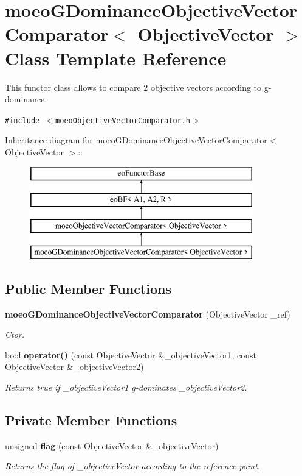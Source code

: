 \section{moeo\-GDominance\-Objective\-Vector\-Comparator$<$ Objective\-Vector $>$ Class Template Reference}
\label{classmoeoGDominanceObjectiveVectorComparator}
This functor class allows to compare 2 objective vectors according to g-dominance.  


{\tt \#include $<$moeo\-Objective\-Vector\-Comparator.h$>$}

Inheritance diagram for moeo\-GDominance\-Objective\-Vector\-Comparator$<$ Objective\-Vector $>$::\begin{figure}[H]
\begin{center}
\leavevmode
\includegraphics[height=4cm]{classmoeoGDominanceObjectiveVectorComparator}
\end{center}
\end{figure}
\subsection*{Public Member Functions}
\begin{CompactItemize}
\item 
{\bf moeo\-GDominance\-Objective\-Vector\-Comparator} (Objective\-Vector \_\-ref)
\begin{CompactList}\small\item\em Ctor. \item\end{CompactList}\item 
bool {\bf operator()} (const Objective\-Vector \&\_\-objective\-Vector1, const Objective\-Vector \&\_\-objective\-Vector2)
\begin{CompactList}\small\item\em Returns true if \_\-objective\-Vector1 g-dominates \_\-objective\-Vector2. \item\end{CompactList}\end{CompactItemize}
\subsection*{Private Member Functions}
\begin{CompactItemize}
\item 
unsigned {\bf flag} (const Objective\-Vector \&\_\-objective\-Vector)
\begin{CompactList}\small\item\em Returns the flag of \_\-objective\-Vector according to the reference point. \item\end{CompactList}\end{CompactItemize}
